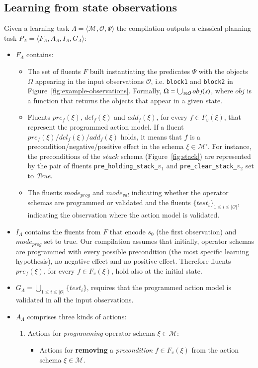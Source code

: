 \documentclass[3p,times]{elsarticle}
\newcommand{\tup}[1]{{\langle #1 \rangle}}
\begin{document}
\subsection{Learning from state observations}
Given a learning task $\Lambda=\tup{\mathcal{M},\mathcal{O},\Psi}$ the compilation outputs a classical planning task $P_{\Lambda}=\tup{F_{\Lambda},A_{\Lambda},I_{\Lambda},G_{\Lambda}}$:
\begin{itemize}
\item $F_{\Lambda}$ contains:
\begin{itemize}
\item The set of fluents $F$ built instantiating the predicates $\Psi$ with the objects $\Omega$ appearing in the input observations $\mathcal{O}$, i.e. {\tt\small block1} and {\tt\small block2} in Figure~\ref{fig:example-observations}. Formally, $\Omega=\bigcup_{\small s\in\mathcal{O}} obj(s)$, where $obj$ is a function that returns the objects that appear in a given state.
\item Fluents $pre_f(\xi)$, $del_f(\xi)$ and $add_f(\xi)$, for every $f\in F_v(\xi)$, that represent the programmed action model. If a fluent $pre_f(\xi)/del_f(\xi)/add_f(\xi)$ holds, it means that $f$ is a precondition/negative/positive effect in the schema $\xi\in \mathcal{M}'$. For instance, the preconditions of the $stack$ schema (Figure~\ref{fig:stack}) are represented by the pair of fluents {\small\tt pre\_holding\_stack\_$v_1$} and {\small\tt pre\_clear\_stack\_$v_2$} set to {\em True}.
\item The fluents $mode_{prog}$ and $mode_{val}$ indicating whether the operator schemas are programmed or validated and the fluents $\{test_i\}_{1\leq i\leq |\mathcal{O}|}$, indicating the observation where the action model is validated.
\end{itemize}
\item $I_{\Lambda}$ contains the fluents from $F$ that encode $s_0$ (the first observation) and $mode_{prog}$ set to true. Our compilation assumes that initially, operator schemas are programmed with every possible precondition (the most specific learning hypothesis), no negative effect and no positive effect. Therefore fluents $pre_f(\xi)$, for every $f\in F_v(\xi)$, hold also at the initial state. 

\item $G_{\Lambda}=\bigcup_{1\leq i\leq |\mathcal{O}|}\{test_i\}$, requires that the programmed action model is validated in all the input observations.
\item $A_{\Lambda}$ comprises three kinds of actions:
\begin{enumerate}
\item Actions for {\em programming} operator schema $\xi\in\mathcal{M}$:
\begin{itemize}
\item Actions for {\bf removing} a {\em precondition} $f\in F_v(\xi)$ from the action schema $\xi\in\mathcal{M}$.


\end{itemize}
\end{enumerate}
\end{itemize}
\end{document}
